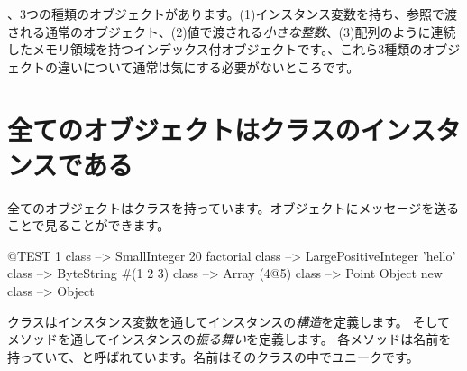 \documentclass[a4paper,10pt,twoside]{book}
\begin{document}
、3つの種類のオブジェクトがあります。(1)インスタンス変数を持ち、参照で渡される通常のオブジェクト、(2)値で渡される\emph{小さな整数}、(3)配列のように連続したメモリ領域を持つインデックス付オブジェクトです。、これら3種類のオブジェクトの違いについて通常は気にする必要がないところです。

\section{全てのオブジェクトはクラスのインスタンスである}


全てのオブジェクトはクラスを持っています。オブジェクトにメッセージを送ることで見ることができます。

\begin{code}{@TEST}
1 class                 --> SmallInteger
20 factorial class --> LargePositiveInteger
'hello' class          --> ByteString
#(1 2 3) class       --> Array
(4@5) class         --> Point
Object new class --> Object
\end{code}

クラスはインスタンス変数を通してインスタンスの\emph{構造}を定義します。
そしてメソッドを通してインスタンスの\emph{振る舞い}を定義します。
各メソッドは名前を持っていて、と呼ばれています。名前はそのクラスの中でユニークです。
\end{document}
